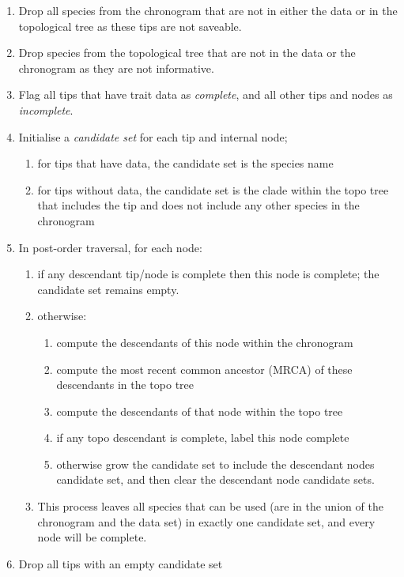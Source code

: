\documentclass[a4paper,11pt]{article}
\begin{document}
\begin{enumerate}
\item Drop all species from the chronogram that are not in either the data or in the topological tree as these tips are not saveable.
\item Drop species from the topological tree that are not in the data or the chronogram as they are not informative.
\item Flag all tips that have trait data as \emph{complete}, and all other tips and nodes as \emph{incomplete}.
\item Initialise a \emph{candidate set} for each tip and internal node;
  \begin{enumerate}
  \item for tips that have data, the candidate set is the species name
  \item for tips without data, the candidate set is the clade within the topo tree that includes the tip and does not include any other species in the chronogram
  \end{enumerate}
\item In post-order traversal, for each node:
\begin{enumerate}
  \item if any descendant tip/node is complete then this node is complete; the candidate set remains empty.
  \item otherwise:
\begin{enumerate}
    \item compute the descendants of this node within the chronogram
    \item compute the most recent common ancestor (MRCA) of these descendants in the topo tree
    \item compute the descendants of that node within the topo tree
    \item if any topo descendant is complete, label this node complete
    \item otherwise grow the candidate set to include the descendant nodes candidate set, and then clear the descendant node candidate sets.
\end{enumerate}
  \item This process leaves all species that can be used (are in the union of the chronogram and the data set) in exactly one candidate set, and every node will be complete.
\end{enumerate}
\item Drop all tips with an empty candidate set
\end{enumerate}
\end{document}
